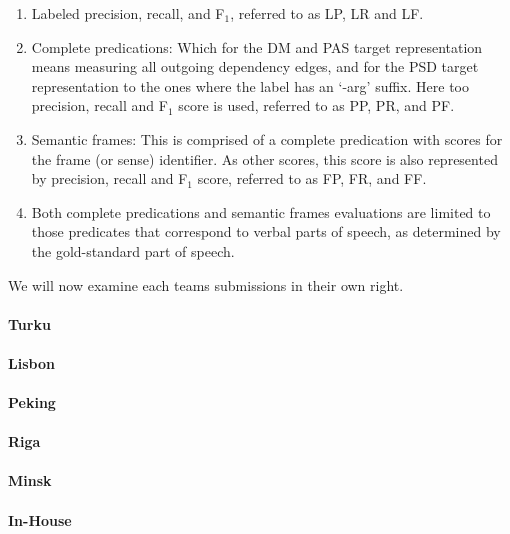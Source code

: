 \begin{enumerate}
    \item Labeled precision, recall, and F$_1$, referred to as LP, LR and LF.
    \item Complete predications: Which for the DM and PAS target representation means measuring all outgoing dependency edges, and for the PSD target representation to the ones where the label has an `-arg' suffix. Here too precision, recall and F$_1$ score is used, referred to as PP, PR, and PF.
    \item Semantic frames: This is comprised of a complete predication with scores for the frame (or sense) identifier. As other scores, this score is also represented by precision, recall and F$_1$ score, referred to as FP, FR, and FF.
    \item Both complete predications and semantic frames evaluations are limited to those predicates that correspond to verbal parts of speech, as determined by the gold-standard part of speech.
\end{enumerate}

We will now examine each teams submissions in their own right.

\paragraph{Turku} 

\paragraph{Lisbon}

\paragraph{Peking}

\paragraph{Riga}

\paragraph{Minsk}

\paragraph{In-House}


